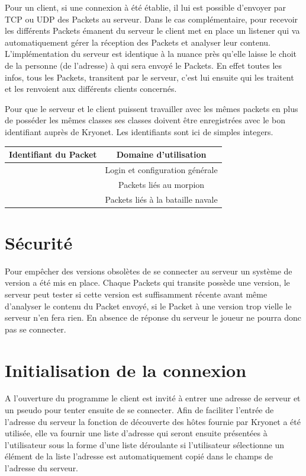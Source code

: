 \documentclass{report}
\begin{document}
Pour un client, si une connexion à été établie, il lui est possible d'envoyer par
TCP ou UDP des Packets au serveur. Dans le cas complémentaire,
pour recevoir les différents Packets émanent du serveur le client met en place
un listener qui va automatiquement gérer la réception des Packets et analyser leur contenu.
L'implémentation du serveur est identique à la nuance près qu'elle laisse le choit
de la personne (de l'adresse) à qui sera envoyé le Packets. En effet toutes les infos, tous les Packets,
transitent par le serveur, c'est lui ensuite qui les traitent et les renvoient aux différents clients concernés.

Pour que le serveur et le client puissent travailler avec les mêmes packets en plus de
posséder les mêmes classes ses classes doivent être enregistrées avec le bon identifiant auprès de
Kryonet. Les identifiants sont ici de simples integers.

\begin{tabular}{|l|c|}
\hline
 Identifiant du Packet & Domaine d'utilisation \\
\hline [0-999] & Login et configuration générale \\
\hline[1000-1999] & Packets liés au morpion \\
\hline[2000-2999] & Packets liés à la bataille navale \\
\hline
\end{tabular}

\section{Sécurité}
Pour empêcher des versions obsolètes de se connecter au serveur un système de version a été mis en place.
Chaque Packets qui transite possède une version, le serveur peut tester si cette version est suffisamment
récente avant même d'analyser le contenu du Packet envoyé, si le Packet à une version trop vielle le serveur n'en fera rien.
En absence de réponse du serveur le joueur ne pourra donc pas se connecter.


\section{Initialisation de la connexion}
A l'ouverture du programme le client est invité à entrer une adresse de serveur
et un pseudo pour tenter ensuite de se connecter. Afin de faciliter l'entrée de l'adresse du serveur la fonction de
découverte des hôtes fournie par Kryonet a été utilisée, elle va fournir une
liste d'adresse qui seront ensuite présentées à l'utilisateur sous la forme d'une liste déroulante
si l'utilisateur sélectionne un élément de la liste l'adresse est automatiquement copié dans le champs de l'adresse du serveur.
\end{document}
